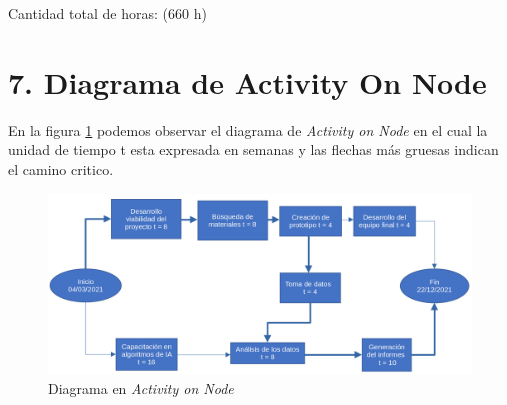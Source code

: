 \documentclass[11pt]{charter}
\begin{document}
\begin{enumerate}
\begin{enumerate}
	\end{enumerate}

\end{enumerate}

Cantidad total de horas: (660 h)



\section{7. Diagrama de Activity On Node}
\label{sec:AoN}





En la figura \ref{fig:AoN} podemos observar el diagrama de \textit{Activity on Node} en el cual la unidad de tiempo t esta expresada en semanas y las flechas más gruesas indican el camino critico.
\newline

\begin{figure}[htpb]
\centering 
\includegraphics[width=\textwidth]{./Figuras/diagAoN.png} %
\caption{Diagrama en \textit{Activity on Node}}
\label{fig:AoN}
\end{figure}


\end{document}
